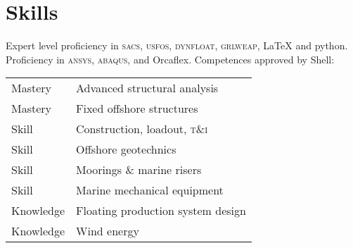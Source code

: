 \section*{Skills} %
\label{sec:comp}

Expert level proficiency in \textsc{sacs}, \textsc{usfos}, \textsc{dynfloat}, \textsc{grlweap}, {\LaTeX} and python. Proficiency in \textsc{ansys}, \textsc{abaqus}, and Orcaflex. Competences approved by Shell:

\noindent\begin{tabular}{l l}
  Mastery & Advanced structural analysis \\
  Mastery & Fixed offshore structures \\
  Skill & Construction, loadout, \textsc{t\&i} \\
  Skill & Offshore geotechnics \\
  Skill & Moorings \& marine risers \\
  Skill & Marine mechanical equipment \\
  Knowledge & Floating production system design \\
  Knowledge & Wind energy \\
\end{tabular}

